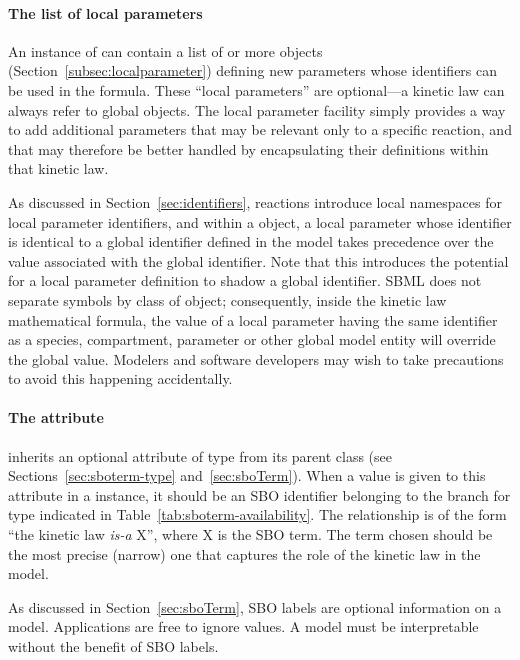 \paragraph{The list of local parameters}

An instance of \KineticLaw can contain a list of  or more
\LocalParameter objects (Section~\ref{subsec:localparameter})
defining new parameters whose identifiers can be used in the
 formula.  These ``local parameters'' are optional---a
kinetic law can always refer to global \Parameter objects.  The
local parameter facility simply provides a way to add additional
parameters that may be relevant only to a specific reaction, and
that may therefore be better handled by encapsulating their
definitions within that kinetic law.

As discussed in Section~\ref{sec:identifiers}, reactions introduce
local namespaces for local parameter identifiers, and within a
\KineticLaw object, a local parameter whose identifier is
identical to a global identifier defined in the model takes
precedence over the value associated with the global identifier.
Note that this introduces the potential for a local parameter
definition to shadow a global identifier.  SBML does not separate
symbols by class of object; consequently, inside the kinetic law
mathematical formula, the value of a local parameter having the
same identifier as a species, compartment, parameter or other
global model entity will override the global value.  Modelers and
software developers may wish to take precautions to avoid this
happening accidentally.


\paragraph{The  attribute}

\KineticLaw  inherits an optional 
attribute of type  from its parent
class \SBase (see Sections~\ref{sec:sboterm-type}
and~\ref{sec:sboTerm}).  When a value is given to this
attribute in a  \KineticLaw instance, it should be an
SBO identifier belonging to the branch for type  \KineticLaw
indicated in Table~\ref{tab:sboterm-availability}.  The relationship is
of the form ``the kinetic law \emph{is-a} X'', where X is
the SBO term.  The term chosen should be the most precise (narrow)
one that captures the role of the kinetic law in the model.

As discussed in Section~\ref{sec:sboTerm}, SBO labels are optional
information on a model.  Applications are free to ignore
 values.  A model must be interpretable without the
benefit of SBO labels.


